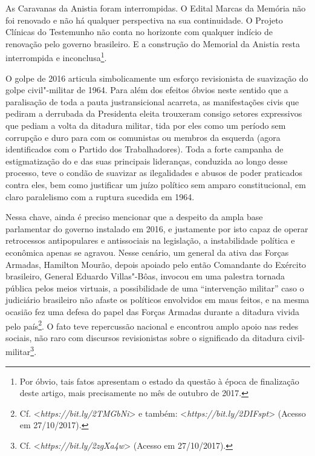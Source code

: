 As Caravanas da Anistia foram interrompidas. O Edital Marcas da Memória
não foi renovado e não há qualquer perspectiva na sua continuidade. O
Projeto Clínicas do Testemunho não conta no horizonte com qualquer
indício de renovação pelo governo brasileiro. E a construção do Memorial
da Anistia resta interrompida e inconclusa\footnote{Por óbvio, tais
  fatos apresentam o estado da questão à época de finalização deste
  artigo, mais precisamente no mês de outubro de 2017.}.

O golpe de 2016 articula simbolicamente um esforço revisionista de
suavização do golpe civil"-militar de 1964. Para além dos efeitos óbvios
neste sentido que a paralisação de toda a pauta justransicional
acarreta, as manifestações civis que pediram a derrubada da Presidenta
eleita trouxeram consigo setores expressivos que pediam a volta da
ditadura militar, tida por eles como um período sem corrupção e duro
para com os comunistas ou membros da esquerda (agora identificados com o
Partido dos Trabalhadores). Toda a forte campanha de estigmatização do
 e das suas principais lideranças, conduzida ao longo desse processo,
teve o condão de suavizar as ilegalidades e abusos de poder praticados
contra eles, bem como justificar um juízo político sem amparo
constitucional, em claro paralelismo com a ruptura sucedida em 1964.

Nessa chave, ainda é preciso mencionar que a despeito da ampla base
parlamentar do governo instalado em 2016, e justamente por isto capaz de
operar retrocessos antipopulares e antissociais na legislação, a
instabilidade política e econômica apenas se agravou. Nesse cenário, um
general da ativa das Forças Armadas, Hamilton Mourão, depois apoiado
pelo então Comandante do Exército brasileiro, General Eduardo
Villas"-Bôas, invocou em uma palestra tornada pública pelos meios
virtuais, a possibilidade de uma ``intervenção militar'' caso o judiciário
brasileiro não afaste os políticos envolvidos em maus feitos, e na mesma
ocasião fez uma defesa do papel das Forças Armadas durante a ditadura
vivida pelo país\footnote{Cf. \textless{}\emph{https://bit.ly/2TMGbNi}\textgreater{}
  e também: \textless{}\emph{https://bit.ly/2DIFspt}\textgreater{}
  (Acesso em 27/10/2017).}. O fato teve repercussão nacional e encontrou
amplo apoio nas redes sociais, não raro com discursos revisionistas
sobre o significado da ditadura civil-militar\footnote{Cf.
\textless{}\emph{https://bit.ly/2zgXa4w}\textgreater{}
  (Acesso em 27/10/2017).}.

